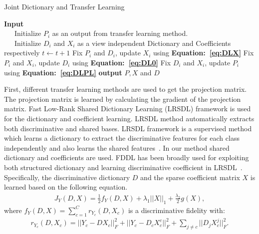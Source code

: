 \begin{algorithm}
	\caption{Joint Dictionary and Transfer Learning}
	\begin{algorithmic}[1]
		\State \textbf{Input}\\
		~~~Initialize $P_i$ as an output from transfer learning method.\\
		~~~Initialize $D_i$ and $X_i$ as a view independent Dictionary and Coefficients respectively 
		\State $t \leftarrow t+1$
		\State Fix $P_i$ and $D_i$, update $X_i$  using \textbf{Equation:~\eqref{eq:DLX}}
		\State Fix $P_i$ and $X_i$, update $D_i$ using \textbf{Equation:~\eqref{eq:DL0}}
		\State Fix $D_i$ and $X_i$, update $P_i$  using \textbf{Equation:~\eqref{eq:DLPL}}
		\EndWhile\label{euclidendwhile}
		\State \textbf{output} $P, X$ and $D$
	\end{algorithmic}
\label{alg:JDTL}
\end{algorithm}
\noindent

First, different transfer learning methods are used to get the projection matrix. The projection matrix is learned by calculating the gradient of the projection matrix. Fast Low-Rank Shared Dictionary Learning (LRSDL) framework is used for the dictionary and coefficient learning. LRSDL method automatically extracts both discriminative and shared bases. LRSDL framework is a supervised method which learns a dictionary to extract the discriminative features for each class independently and also learns the shared features~\cite{7987024}. In our method shared dictionary and coefficients are used. FDDL has been broadly used for exploiting both structured dictionary and learning discriminative coefficient in LRSDL~\cite{612628612}. Specifically, the discriminative dictionary $D$ and the sparse coefficient matrix $X$ is learned based on the following equation.
\begin{equation}
\begin{aligned}
	J_Y(D,X) = \frac{1}{2}f_Y(D,X) + \lambda_1||X||_1 + \frac{\lambda_2}{2}g(X),
\end{aligned}
\label{eq:DL}
\end{equation}
where $f_Y(D,X) =  \sum\limits_{c=1}^{C} r_{Y_c}(D,X_c)$ is a discriminative fidelity with:
\begin{equation}
\begin{aligned}
r_{Y_c}(D,X_c) = ||Y_c-DX_c||_F^2 + ||Y_c - D_cX_c^c||_F^2 + \sum\limits_{j\neq c}||D_jX_c^j||_F^2.
\end{aligned}
\end{equation}

